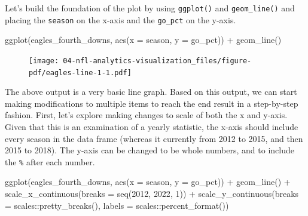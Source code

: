 \documentclass[
  letterpaper,
]{krantz}
\newenvironment{Shaded}{\begin{snugshade}}{\end{snugshade}}
\newcommand{\AttributeTok}[1]{\textcolor[rgb]{0.40,0.45,0.13}{#1}}
\newcommand{\DecValTok}[1]{\textcolor[rgb]{0.68,0.00,0.00}{#1}}
\newcommand{\FunctionTok}[1]{\textcolor[rgb]{0.28,0.35,0.67}{#1}}
\newcommand{\NormalTok}[1]{\textcolor[rgb]{0.00,0.23,0.31}{#1}}
\newcommand{\SpecialCharTok}[1]{\textcolor[rgb]{0.37,0.37,0.37}{#1}}
\begin{document}
Let's build the foundation of the plot by using \texttt{ggplot()} and
\texttt{geom\_line()} and placing the \texttt{season} on the x-axis and
the \texttt{go\_pct} on the y-axis.

\begin{Shaded}
\begin{Highlighting}[]
\FunctionTok{ggplot}\NormalTok{(eagles\_fourth\_downs, }\FunctionTok{aes}\NormalTok{(}\AttributeTok{x =}\NormalTok{ season, }\AttributeTok{y =}\NormalTok{ go\_pct)) }\SpecialCharTok{+}
  \FunctionTok{geom\_line}\NormalTok{()}
\end{Highlighting}
\end{Shaded}

\begin{figure}[H]

{\centering \texttt{[image: 04-nfl-analytics-visualization\_files/figure-pdf/eagles-line-1-1.pdf]}

}

\end{figure}

The above output is a very basic line graph. Based on this output, we
can start making modifications to multiple items to reach the end result
in a step-by-step fashion. First, let's explore making changes to scale
of both the x and y-axis. Given that this is an examination of a yearly
statistic, the x-axis should include every season in the data frame
(whereas it currently from 2012 to 2015, and then 2015 to 2018). The
y-axis can be changed to be whole numbers, and to include the
\texttt{\%} after each number.

\begin{Shaded}
\begin{Highlighting}[]
\FunctionTok{ggplot}\NormalTok{(eagles\_fourth\_downs, }\FunctionTok{aes}\NormalTok{(}\AttributeTok{x =}\NormalTok{ season, }\AttributeTok{y =}\NormalTok{ go\_pct)) }\SpecialCharTok{+}
  \FunctionTok{geom\_line}\NormalTok{() }\SpecialCharTok{+}
  \FunctionTok{scale\_x\_continuous}\NormalTok{(}\AttributeTok{breaks =} \FunctionTok{seq}\NormalTok{(}\DecValTok{2012}\NormalTok{, }\DecValTok{2022}\NormalTok{, }\DecValTok{1}\NormalTok{)) }\SpecialCharTok{+}
  \FunctionTok{scale\_y\_continuous}\NormalTok{(}\AttributeTok{breaks =}\NormalTok{ scales}\SpecialCharTok{::}\FunctionTok{pretty\_breaks}\NormalTok{(),}
                     \AttributeTok{labels =}\NormalTok{ scales}\SpecialCharTok{::}\FunctionTok{percent\_format}\NormalTok{())}
\end{Highlighting}
\end{Shaded}
\end{document}
